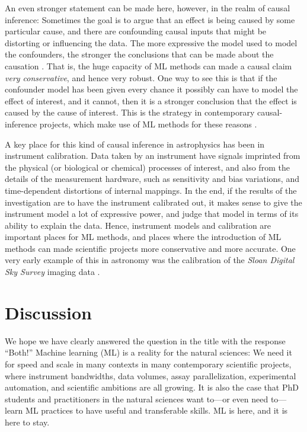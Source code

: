 \documentclass[10pt]{article}
\begin{document}
An even stronger statement can be made here, however, in the realm of causal inference:
Sometimes the goal is to argue that an effect is being caused by some particular cause, and there are confounding causal inputs that might be distorting or influencing the data.
The more expressive the model used to model the confounders, the stronger the conclusions that can be made about the causation \cite{causal_inference}.
That is, the huge capacity of ML methods can made a causal claim \emph{very conservative}, and hence very robust.
One way to see this is that if the confounder model has been given every chance it possibly can have to model the effect of interest, and it cannot, then it is a stronger conclusion that the effect is caused by the cause of interest.
This is the strategy in contemporary causal-inference projects, which make use of ML methods for these reasons \cite{bart}.

A key place for this kind of causal inference in astrophysics has been in instrument calibration.
Data taken by an instrument have signals imprinted from the physical (or biological or chemical) processes of interest, and also from the details of the measurement hardware, such as sensitivity and bias variations, and time-dependent distortions of internal mappings.
In the end, if the results of the investigation are to have the instrument calibrated out, it makes sense to give the instrument model a lot of expressive power, and judge that model in terms of its ability to explain the data.
Hence, instrument models and calibration are important places for ML methods, and places where the introduction of ML methods can made scientific projects more conservative and more accurate.
One very early example of this in astronomy was the calibration of the \textsl{Sloan Digital Sky Survey} imaging data \cite{ubercalibration}.

\section{Discussion}\label{sec:discussion}

We hope we have clearly answered the question in the title with the response ``Both!''
Machine learning (ML) is a reality for the natural sciences:
We need it for speed and scale in many contexts in many contemporary scientific projects, where instrument bandwidths, data volumes, assay parallelization, experimental automation, and scientific ambitions are all growing.
It is also the case that PhD students and practitioners in the natural sciences want to---or even need to---learn ML practices to have useful and transferable skills.
ML is here, and it is here to stay.
\end{document}
